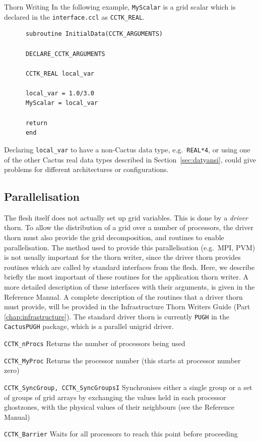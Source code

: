 \begin{cactuspart}{Thorn Writing}
In the following example, \verb|MyScalar| is a grid scalar which
is declared in the \texttt{interface.ccl} as \texttt{CCTK\_REAL}.
%
\begin{verbatim}
      subroutine InitialData(CCTK_ARGUMENTS)

      DECLARE_CCTK_ARGUMENTS

      CCTK_REAL local_var

      local_var = 1.0/3.0
      MyScalar = local_var

      return
      end
\end{verbatim}
%
Declaring \texttt{local\_var} to have a non-Cactus data type, e.g.\
\texttt{REAL*4}, or using one of the other Cactus real data types
described in Section~\ref{sec:datyansi}, could give problems for
different architectures or configurations.


\subsection{Parallelisation}
\label{sec:parallelisation}

The flesh itself does not actually set up grid variables. This
is done by a \textit{driver} thorn. To allow the distribution of
a grid over a number of processors, the driver thorn must
also provide the grid decomposition, and routines to enable
parallelisation. The method used to provide this parallelisation
(e.g.\ MPI, PVM) is not usually important for the thorn writer, since
the driver thorn provides routines which are called by standard interfaces
from the flesh. Here, we describe briefly the most important of these routines
for the application thorn writer. A more detailed description
of these interfaces with their arguments, is given in the Reference Manual.
A complete description of the
routines that a driver thorn must provide, will be provided in the
Infrastructure Thorn Writers Guide (Part \ref{chap:infrastructure}). The standard driver thorn is
currently \texttt{PUGH} in the \texttt{CactusPUGH} package, which
is a parallel unigrid driver.

\begin{Lentry}
\item[\texttt{CCTK\_nProcs}] Returns the number of processors being used
\item[\texttt{CCTK\_MyProc}] Returns the processor number (this starts at
  processor number zero)
\item[\texttt{CCTK\_SyncGroup, CCTK\_SyncGroupsI}] Synchronises either a single
  group or a set of groups of grid arrays by
  exchanging the values held in each processor ghostzones, with the
  physical values of their neighbours (see the Reference Manual)
\item[\texttt{CCTK\_Barrier}] Waits for all processors to reach this point
  before proceeding
\end{Lentry}


\end{cactuspart}

